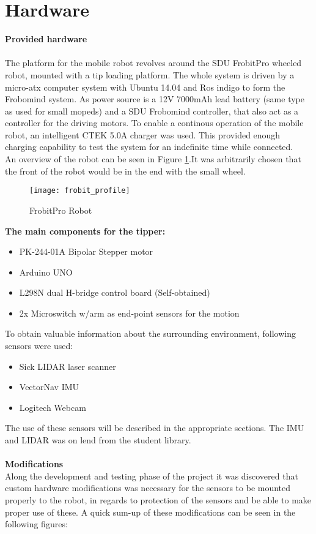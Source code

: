 \section{Hardware} %
\label{sec:mr_hardware}

\textbf{Provided hardware}
\\
\\
The platform for the mobile robot revolves around the SDU FrobitPro wheeled 
robot, mounted with a tip loading platform. The whole system is driven 
by a micro-atx computer system with Ubuntu 14.04 and Ros indigo to form the 
Frobomind system. As power source is a 12V 7000mAh lead battery (same type as 
used for 
small mopeds) and a SDU Frobomind controller, that also act as a controller for 
the driving motors. To enable a continous operation of the mobile robot, an 
intelligent CTEK 5.0A charger was used. This provided enough charging 
capability to test the system for an indefinite time while connected.\\ An 
overview of the robot can be seen in Figure \ref{fig:frobit}.It was arbitrarily 
chosen that the front of the robot would be in the end with the small wheel.\\
\begin{figure}[H]
	\centering
	\texttt{[image: frobit\_profile]}
	\caption{FrobitPro Robot}
	\label{fig:frobit}
	\end{figure}
\textbf{The main components for the tipper:}
\begin{itemize}
	\item PK-244-01A Bipolar Stepper motor
	\item Arduino UNO
	\item L298N dual H-bridge control board (Self-obtained)
	\item 2x Microswitch w/arm as end-point sensors for the motion
\end{itemize}   

To obtain valuable information about the surrounding environment, following 
sensors were used:\\
\begin{itemize}
	\item Sick LIDAR laser scanner
	\item VectorNav	 IMU
	\item Logitech Webcam
\end{itemize} 

The use of these sensors will be described in the appropriate sections. The IMU 
and LIDAR was on lend from the student library.\\
\\
\textbf{Modifications}\\
Along the development and testing phase of the project it was discovered that 
custom hardware modifications was necessary for the sensors to be mounted 
properly to the robot, in regards to protection of the sensors and be able to 
make proper use of these. A quick sum-up of these modifications can be seen in 
the following figures:\\

